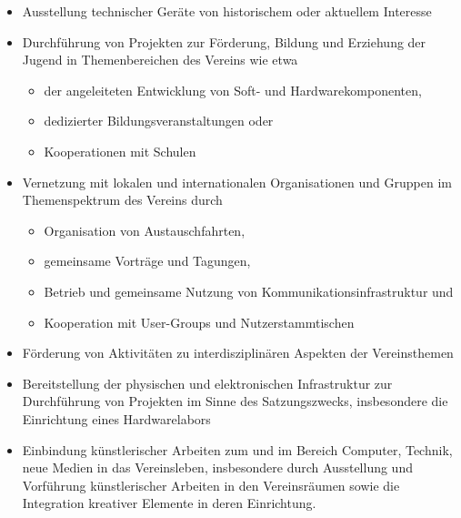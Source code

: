 \documentclass[fontsize=12pt,paper=a4,pagesize]{scrartcl}
\begin{document}
\begin{enumerate}
\begin{itemize}
		\item Ausstellung technischer Geräte von historischem oder aktuellem
			Interesse

		\item Durchführung von Projekten zur Förderung, Bildung und Erziehung
			der Jugend in Themenbereichen des Vereins wie etwa
			\begin{itemize}
				\item der angeleiteten Entwicklung von Soft- und Hardwarekomponenten,
				\item dedizierter Bildungsveranstaltungen oder
	    		\item Kooperationen mit Schulen
	    	\end{itemize}
		\item Vernetzung mit lokalen und internationalen Organisationen und
			Gruppen im Themenspektrum des Vereins durch
			\begin{itemize}
				\item Organisation von Austauschfahrten,
				\item gemeinsame Vorträge und Tagungen,
				\item Betrieb und gemeinsame Nutzung von
					Kommunikationsinfrastruktur und
				\item Kooperation mit User-Groups und Nutzerstammtischen
			\end{itemize}

		\item Förderung von Aktivitäten zu interdisziplinären Aspekten der
			Vereinsthemen

		\item Bereitstellung der physischen und elektronischen Infrastruktur zur
			Durchführung von Projekten im Sinne des Satzungszwecks,
			insbesondere die Einrichtung eines Hardwarelabors

		\item Einbindung künstlerischer Arbeiten zum und im Bereich Computer,
			Technik, neue Medien in das Vereinsleben, insbesondere durch
			Ausstellung und Vorführung künstlerischer Arbeiten in den
			Vereinsräumen sowie die Integration kreativer Elemente in
			deren Einrichtung.
	\end{itemize}
\end{enumerate}
\end{document}
